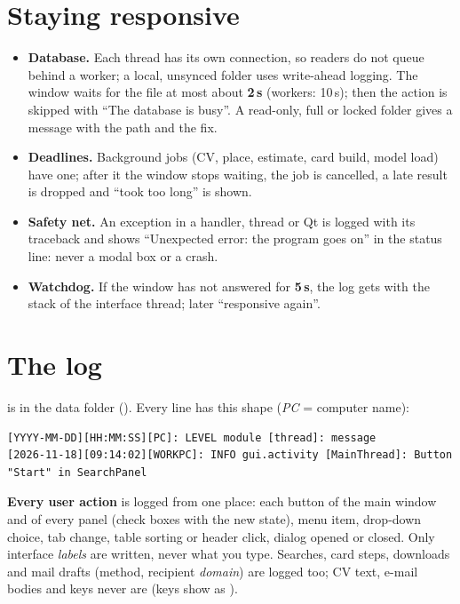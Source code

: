 \section{Staying responsive}\label{sec:robust}
\begin{itemize}
  \item \textbf{Database.} Each thread has its own connection, so readers do not queue
        behind a worker; a local, unsynced folder uses write-ahead logging. The window
        waits for the file at most about \textbf{2\,s} (workers: 10\,s); then the action is
        skipped with ``The database is busy''. A read-only, full or locked folder gives a
        message with the path and the fix.
  \item \textbf{Deadlines.} Background jobs (CV, place, estimate, card build, model load)
        have one; after it the window stops waiting, the job is cancelled, a late result
        is dropped and ``took too long'' is shown.
  \item \textbf{Safety net.} An exception in a handler, thread or Qt is logged with its traceback and shows
        ``Unexpected error: the program goes on'' in the status line: never a modal box or a crash.
  \item \textbf{Watchdog.} If the window has not answered for \textbf{5\,s}, the log gets
         with the stack of the interface thread; later ``responsive again''.
\end{itemize}

\section{The log}\label{sec:log}
 is in the data folder (). Every line has this shape (\emph{PC} = computer name):
\begin{lstlisting}[basicstyle=\ttfamily\footnotesize]
[YYYY-MM-DD][HH:MM:SS][PC]: LEVEL module [thread]: message
[2026-11-18][09:14:02][WORKPC]: INFO gui.activity [MainThread]: Button "Start" in SearchPanel
\end{lstlisting}
\textbf{Every user action} is logged from one place: each button of the main window and of every panel
(check boxes with the new state), menu item, drop-down choice, tab change, table sorting or header click, dialog opened or closed. Only interface \emph{labels} are written, never what you type.
Searches, card steps, downloads and mail drafts (method, recipient \emph{domain}) are logged too; CV text, e-mail bodies
and keys never are (keys show as \code{***}).

